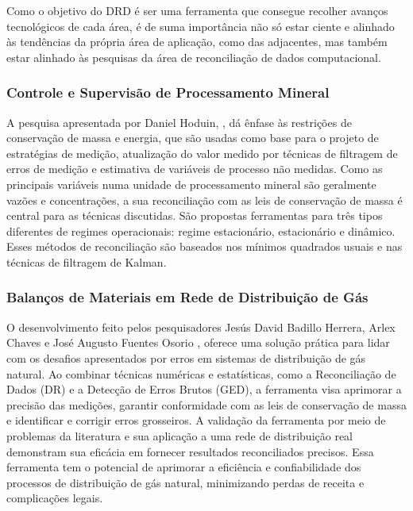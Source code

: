 Como o objetivo do DRD é ser uma ferramenta que consegue recolher avanços tecnológicos de cada área, é de suma importância não só estar ciente e alinhado às tendências da própria área de aplicação, como das adjacentes, mas também estar alinhado às pesquisas da área de reconciliação de dados computacional. 

\subsubsection{Controle e Supervisão de Processamento Mineral}

A pesquisa apresentada por Daniel Hoduin, \cite{danielhoduin}, dá  ênfase às restrições de conservação de massa e energia, que são usadas como base para o projeto de estratégias de medição, atualização do valor medido por técnicas de filtragem de erros de medição e estimativa de variáveis de processo não medidas. Como as principais variáveis numa unidade de processamento mineral são geralmente vazões e concentrações, a sua reconciliação com as leis de conservação de massa é central para as técnicas discutidas. São propostas ferramentas para três tipos diferentes de regimes operacionais: regime estacionário, estacionário e dinâmico. Esses métodos de reconciliação são baseados nos mínimos quadrados usuais e nas técnicas de filtragem de Kalman.

\subsubsection{Balanços de Materiais em Rede de Distribuição de Gás}

O desenvolvimento feito pelos pesquisadores Jesús David Badillo Herrera, Arlex Chaves e José Augusto Fuentes Osorio \cite{balancecontrol}, oferece uma solução prática para lidar com os desafios apresentados por erros em sistemas de distribuição de gás natural. Ao combinar técnicas numéricas e estatísticas, como a Reconciliação de Dados (DR) e a Detecção de Erros Brutos (GED), a ferramenta visa aprimorar a precisão das medições, garantir conformidade com as leis de conservação de massa e identificar e corrigir erros grosseiros. A validação da ferramenta por meio de problemas da literatura e sua aplicação a uma rede de distribuição real demonstram sua eficácia em fornecer resultados reconciliados precisos. Essa ferramenta tem o potencial de aprimorar a eficiência e confiabilidade dos processos de distribuição de gás natural, minimizando perdas de receita e complicações legais.

